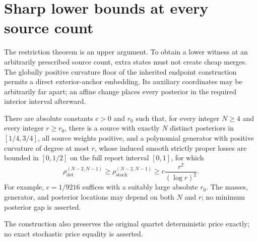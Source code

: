 \section{Sharp lower bounds at every source count}
\label{sec:embedding}

The restriction theorem is an upper argument. To obtain a lower witness at
an arbitrarily prescribed source count, extra states must not create cheap
merges. The globally positive curvature floor of the inherited endpoint
construction permits a direct exterior-anchor embedding. Its auxiliary
coordinates may be arbitrarily far apart; an affine change places every
posterior in the required interior interval afterward.

\begin{theorem}
\label{thm:embedding}

There are absolute constants $c>0$ and $r_0$ such that, for every integer
$N\ge4$ and every integer $r\ge r_0$, there is a source with exactly
$N$ distinct posteriors in $[1/4,3/4]$, all source weights positive,
and a polynomial generator with positive curvature of degree at most
$r$, whose induced smooth strictly proper losses are bounded in
$[0,1/2]$ on the full report interval $[0,1]$, for which
\[
 \rho_{\mathrm{det}}^{(N-2,N-1)}
 \ge\rho_{\mathrm{stoch}}^{(N-2,N-1)}
 \ge c\frac{r^2}{(\log r)^2}.
\]
For example, $c=1/9216$ suffices with a suitably large absolute $r_0$.
The masses, generator, and posterior locations may depend on both $N$
and $r$; no minimum posterior gap is asserted.


The construction also preserves the original quartet deterministic price
exactly; no exact stochastic price equality is asserted.
\end{theorem}
